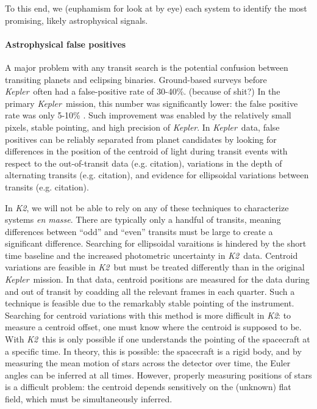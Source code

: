 \documentclass[12pt,preprint]{aastex}
\newcommand{\project}[1]{\textsl{#1}} %
\newcommand{\kepler}{\project{Kepler}}
\newcommand{\KT}{\project{K2}}
\begin{document}
To this end, we (euphamism for look at by eye) each system to identify the
most promising, likely astrophysical signals.

\paragraph{Astrophysical false positives}

A major problem with any transit search is the potential confusion between
transiting planets and eclipsing binaries.
Ground-based surveys before \kepler\ often had a false-positive rate
of 30-40\%. (because of shit?)
In the primary \kepler\ mission, this number was significantly lower:
the false positive rate was only 5-10\% \citep{Morton:2011}.
Such improvement was enabled by the relatively small pixels, stable
pointing, and high precision of \kepler.
In \kepler\ data, false positives can be reliably separated from
planet candidates by looking for differences in the position of the
centroid of light during transit events with respect to the
out-of-transit data (e.g. citation), variations in the depth of
alternating transits (e.g. citation), and evidence for ellipsoidal
variations between transits (e.g. citation).

In \KT, we will not be able to rely on any of these techniques to
characterize systems \textit{en masse}.
There are typically only a handful of transits, meaning differences
between ``odd'' and ``even'' transits must be large to create
a significant difference.
Searching for ellipsoidal varaitions is hindered by the short time
baseline and the increased photometric uncertainty in \KT\ data.
Centroid variations are feasible in \KT\ but must be treated differently
than in the original \kepler\ mission.
In that data, centroid positions are measured for the data during and out of
transit by coadding all the relevant frames in each quarter.
Such a technique is feasible due to the remarkably stable pointing of the
instrument.
Searching for centroid variations with this method is more difficult in \KT:
to measure a centroid offset, one must know where the centroid is
supposed to be.
With \KT\ this is only possible if one understands the pointing of the
spacecraft at a specific time.
In theory, this is possible: the spacecraft is a rigid body, and by measuring
the mean motion of stars across the detector over time, the
Euler angles can be inferred at all times.
However, properly measuring positions of stars is a difficult problem:
the centroid depends sensitively on the (unknown) flat field, which must
be simultaneously inferred.
\end{document}
